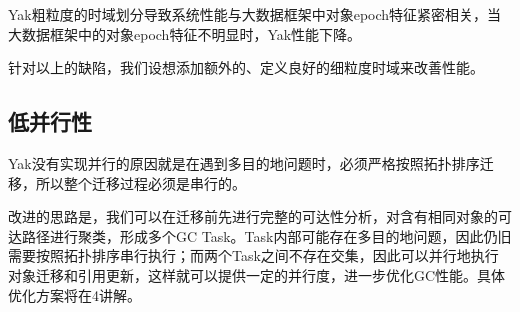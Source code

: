 Yak粗粒度的时域划分导致系统性能与大数据框架中对象epoch特征紧密相关，当大数据框架中的对象epoch特征不明显时，Yak性能下降。

针对以上的缺陷，我们设想添加额外的、定义良好的细粒度时域来改善性能。

\subsection{低并行性}

Yak没有实现并行的原因就是在遇到多目的地问题时，必须严格按照拓扑排序迁移，所以整个迁移过程必须是串行的。

改进的思路是，我们可以在迁移前先进行完整的可达性分析，对含有相同对象的可达路径进行聚类，形成多个GC Task。Task内部可能存在多目的地问题，因此仍旧需要按照拓扑排序串行执行；而两个Task之间不存在交集，因此可以并行地执行对象迁移和引用更新，这样就可以提供一定的并行度，进一步优化GC性能。具体优化方案将在4讲解。

